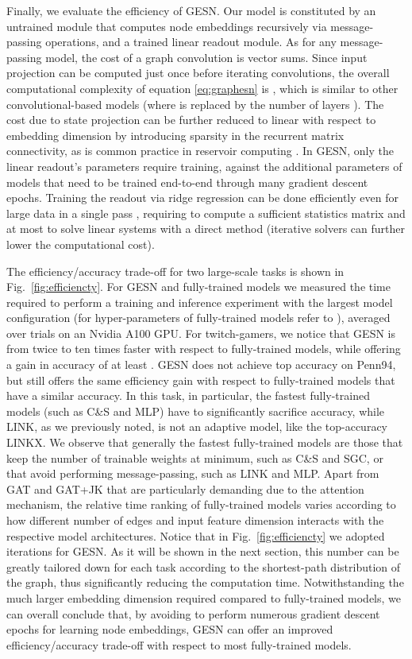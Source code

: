\documentclass[final,5p,times,twocolumn]{elsarticle}
\begin{document}
Finally, we evaluate the efficiency of GESN.
Our model is constituted by an untrained module that computes node embeddings recursively via  message-passing operations, and a trained linear readout module.
As for any message-passing model, the cost of a graph convolution is  vector sums.
Since input projection can be computed just once before iterating convolutions, the overall computational complexity of equation \eqref{eq:graphesn} is , which is similar to other convolutional-based models (where  is replaced by the number of layers ).
The cost  due to state projection can be further reduced to linear with respect to embedding dimension  by introducing sparsity in the recurrent matrix connectivity, as is common practice in reservoir computing \cite{Gallicchio2020}.
In GESN, only the linear readout's  parameters require training, against the additional  parameters of models that need to be trained end-to-end through many gradient descent epochs.
Training the readout via ridge regression can be done efficiently even for large data in a single pass \cite{Zhang2017}, requiring  to compute a sufficient statistics matrix and at most  to solve  linear systems with a direct method (iterative solvers can further lower the computational cost).

The efficiency/accuracy trade-off for two large-scale tasks is shown in Fig.~\ref{fig:efficiencty}.
For GESN and fully-trained models we measured the time required to perform a training and inference experiment with the largest model configuration (for hyper-parameters of fully-trained models refer to \cite{Lim2021}), averaged over  trials on an Nvidia A100 GPU.
For twitch-gamers, we notice that GESN is from twice to ten times faster with respect to fully-trained models, while offering a gain in accuracy of at least .
GESN does not achieve top accuracy on Penn94, but still offers the same efficiency gain with respect to fully-trained models that have a similar accuracy.
In this task, in particular, the fastest fully-trained models (such as C\&S and MLP) have to significantly sacrifice accuracy, while LINK, as we previously noted, is not an adaptive model, like the top-accuracy LINKX.
We observe that generally the fastest fully-trained models are those that keep the number of trainable weights at minimum, such as C\&S and SGC, or that avoid performing message-passing, such as LINK and MLP.
Apart from GAT and GAT+JK that are particularly demanding due to the attention mechanism, the relative time ranking of fully-trained models varies according to how different number of edges and input feature dimension interacts with the respective model architectures.
Notice that in Fig.~\ref{fig:efficiencty} we adopted  iterations for GESN.
As it will be shown in the next section, this number can be greatly tailored down for each task according to the shortest-path distribution of the graph, thus significantly reducing the computation time.
Notwithstanding the much larger embedding dimension required compared to fully-trained models, we can overall conclude that, by avoiding to perform numerous gradient descent epochs for learning node embeddings, GESN can offer an improved efficiency/accuracy trade-off with respect to most fully-trained models.
\end{document}
